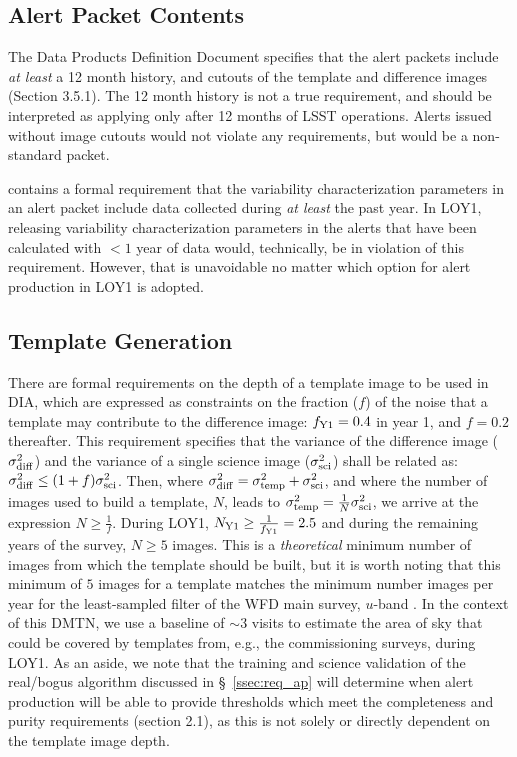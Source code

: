 \documentclass[DM,lsstdraft,toc]{lsstdoc}
\begin{document}
\subsection{Alert Packet Contents}\label{ssec:req_apc}

The Data Products Definition Document  specifies that the alert packets include {\em at least} a 12 month history, and cutouts of the template and difference images (Section 3.5.1).
The 12 month history is not a true requirement, and should be interpreted as applying only after 12 months of LSST operations.
Alerts issued without image cutouts would not violate any requirements, but would be a non-standard packet. 

 contains a formal requirement that the variability characterization parameters in an alert packet include data collected during {\em at least} the past year.
In LOY1, releasing variability characterization parameters in the alerts that have been calculated with $<1$ year of data would, technically, be in violation of this requirement.
However, that is unavoidable no matter which option for alert production in LOY1 is adopted.

\subsection{Template Generation}\label{ssec:req_temp}

There are formal requirements on the depth of a template image to be used in DIA, which are expressed as constraints on the fraction ($f$) of the noise that a template may contribute to the difference image: $f_{\rm Y1}=0.4$ in year 1, and $f=0.2$ thereafter.
This requirement specifies that the variance of the difference image ($\sigma_{\rm diff}^2$) and the variance of a single science image ($\sigma_{\rm sci}^2$) shall be related as: $\sigma_{\rm diff}^2 \leq (1+f)\sigma_{\rm sci}^2$.
Then, where $\sigma_{\rm diff}^2 = \sigma_{\rm temp}^2 + \sigma_{\rm sci}^2$, and where the number of images used to build a template, $N$, leads to $\sigma_{\rm temp}^2 = \frac{1}{N} \sigma_{\rm sci}^2$, we arrive at the expression $N \geq \frac{1}{f}$.
During LOY1, $N_{\rm Y1} \geq \frac{1}{f_{\rm Y1}} = 2.5$ and during the remaining years of the survey, $N \geq 5$ images.
This is a {\em theoretical} minimum number of images from which the template should be built, but it is worth noting that this minimum of $5$ images for a template matches the minimum number images per year for the least-sampled filter of the WFD main survey, $u$-band \citep{Ivezi__2019}.
In the context of this DMTN, we use a baseline of $\sim$3 visits to estimate the area of sky that could be covered by templates from, e.g., the commissioning surveys, during LOY1.
As an aside, we note that the training and science validation of the real/bogus algorithm discussed in \S~\ref{ssec:req_ap} will determine when alert production will be able to provide thresholds which meet the completeness and purity requirements (section 2.1), as this is not solely or directly dependent on the template image depth.
\end{document}
